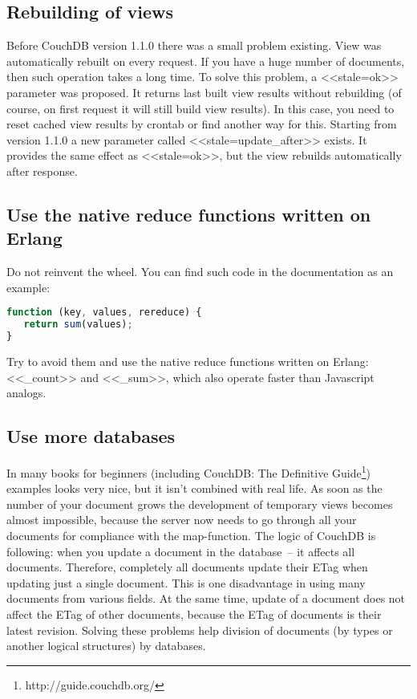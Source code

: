 \subsection{Rebuilding of views}

Before CouchDB version 1.1.0 there was a small problem existing. View was automatically rebuilt on every request. If you have a huge number of documents, then such operation takes a long time. To solve this problem, a <<stale=ok>> parameter was proposed. It returns last built view results without rebuilding (of course, on first request it will still build view results). In this case, you need to reset cached view results by crontab or find another way for this. Starting from version 1.1.0 a new parameter called <<stale=update\_after>> exists. It provides the same effect as <<stale=ok>>, but the view rebuilds automatically after response.

\subsection{Use the native reduce functions written on Erlang}

Do not reinvent the wheel. You can find such code in the documentation as an example:

\begin{lstlisting}[language=Javascript]
function (key, values, rereduce) {
   return sum(values);
}
\end{lstlisting}

Try to avoid them and use the native reduce functions written on Erlang: <<\_count>> and <<\_sum>>, which also operate faster than Javascript analogs.

\subsection{Use more databases}

In many books for beginners (including CouchDB: The Definitive Guide\footnote{http://guide.couchdb.org/}) examples looks very nice, but it isn’t combined with real life. As soon as the number of your document grows the development of temporary views becomes almost impossible, because the server now needs to go through all your documents for compliance with the map-function. The logic of CouchDB is following: when you update a document in the database~-- it affects all documents. Therefore, completely all documents update their ETag when updating just a single document. This is one disadvantage in using many documents from various fields. At the same time, update of a document does not affect the ETag of other documents, because the ETag of documents is their latest revision. Solving these problems help division of documents (by types or another logical structures) by databases.

